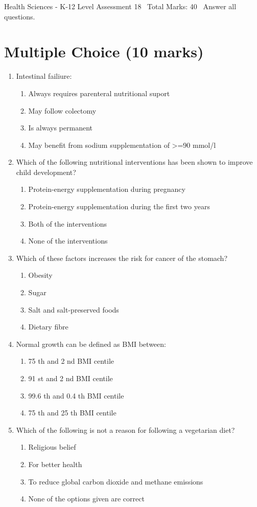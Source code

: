 \documentclass[12pt]{article}
\begin{document}
\begin{center}
Health Sciences - K-12 Level Assessment 18 \
Total Marks: 40 \
Answer all questions.
\end{center}

\section*{Multiple Choice (10 marks)}
\begin{enumerate}[label=\arabic*.]
\item Intestinal failiure:
\begin{enumerate}[label=(\alph*)]
    \item Always requires parenteral nutritional suport
    \item May follow colectomy
    \item Is always permanent
    \item May benefit from sodium supplementation of \textgreater{}=90 mmol/l
\end{enumerate}
\item Which of the following nutritional interventions has been shown to improve child development?
\begin{enumerate}[label=(\alph*)]
    \item Protein-energy supplementation during pregnancy
    \item Protein-energy supplementation during the first two years
    \item Both of the interventions
    \item None of the interventions
\end{enumerate}
\item Which of these factors increases the risk for cancer of the stomach?
\begin{enumerate}[label=(\alph*)]
    \item Obesity
    \item Sugar
    \item Salt and salt-preserved foods
    \item Dietary fibre
\end{enumerate}
\item Normal growth can be defined as BMI between:
\begin{enumerate}[label=(\alph*)]
    \item 75 th and 2 nd BMI centile
    \item 91 st and 2 nd BMI centile
    \item 99.6 th and 0.4 th BMI centile
    \item 75 th and 25 th BMI centile
\end{enumerate}
\item Which of the following is not a reason for following a vegetarian diet?
\begin{enumerate}[label=(\alph*)]
    \item Religious belief
    \item For better health
    \item To reduce global carbon dioxide and methane emissions
    \item None of the options given are correct
\end{enumerate}
\end{enumerate}
\end{document}
